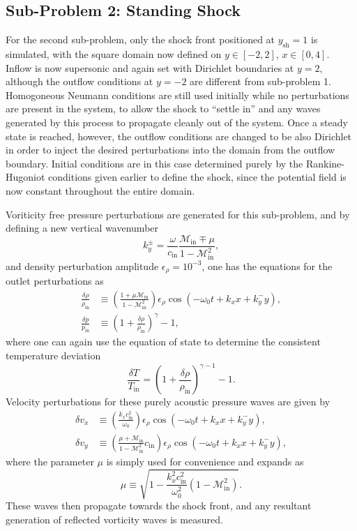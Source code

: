 \subsection{Sub-Problem 2: Standing Shock}
\label{subsec:sub_problem_2}

For the second sub-problem, only the shock front positioned at $y_\textrm{sh}=1$ is simulated, with the square domain now defined on $y\in[-2,2]$, $x\in[0,4]$. Inflow is now supersonic and again set with Dirichlet boundaries at $y=2$, although the outflow conditions at $y=-2$ are different from sub-problem 1. Homogoneous Neumann conditions are still used initially while no perturbations are present in the system, to allow the shock to ``settle in'' and any waves generated by this process to propagate cleanly out of the system. Once a steady state is reached, however, the outflow conditions are changed to be also Dirichlet in order to inject the desired perturbations into the domain from the outflow boundary. Initial conditions are in this case determined purely by the Rankine-Hugoniot conditions given earlier to define the shock, since the potential field is now constant throughout the entire domain.

Voriticity free pressure perturbations are generated for this sub-problem, and by defining a new vertical wavenumber
\begin{equation}
k_y^\pm=\frac{\omega}{c_\textrm{in}}\frac{\mathcal{M}_\textrm{in}\mp\mu}{1-\mathcal{M}_\textrm{in}^2},
\end{equation}
and density perturbation amplitude $\epsilon_\rho=10^{-3}$, one has the equations for the outlet perturbations as
\begin{align}
\frac{\delta\rho}{\rho_\textrm{in}}&\equiv\left(\frac{1+\mu\mathcal{M}_\textrm{in}}{1-\mathcal{M}_\textrm{in}^2}\right)\epsilon_\rho\cos\left(-\omega_0t+k_xx+k_y^-y\right), \\
\frac{\delta p}{p_\textrm{in}}&\equiv\left(1+\frac{\delta\rho}{\rho_\textrm{in}}\right)^\gamma-1,
\end{align}
where one can again use the equation of state to determine the consistent temperature deviation
\begin{equation}
\frac{\delta T}{T_\textrm{in}}=\left(1+\frac{\delta\rho}{\rho_\textrm{in}}\right)^{\gamma-1}-1.
\end{equation}
Velocity perturbations for these purely acoustic pressure waves are given by
\begin{align}
\delta v_x&\equiv\left(\frac{k_xc_\textrm{in}^2}{\omega_0}\right)\epsilon_\rho\cos\left(-\omega_0t+k_xx+k_y^-y\right), \\
\delta v_y&\equiv\left(\frac{\mu+\mathcal{M}_\textrm{in}}{1-\mathcal{M}_\textrm{in}^2}c_\textrm{in}\right)\epsilon_\rho\cos\left(-\omega_0t+k_xx+k_y^-y\right),
\end{align}
where the parameter $\mu$ is simply used for convenience and expands as
\begin{equation}
\mu\equiv\sqrt{1-\frac{k_x^2c_\textrm{in}^2}{\omega_0^2}\left(1-\mathcal{M}_\textrm{in}^2\right)}.
\end{equation}
These waves then propagate towards the shock front, and any resultant generation of reflected vorticity waves is measured.

